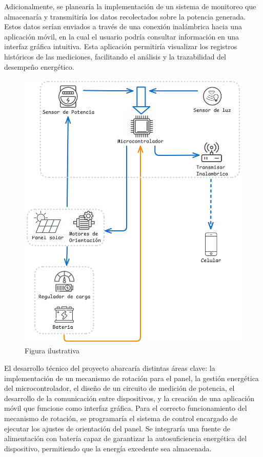 \documentclass[a4paper,12pt]{article}
\begin{document}
Adicionalmente, se planearía la implementación de un sistema de monitoreo que almacenaría y transmitiría los datos recolectados sobre la potencia generada. Estos datos serían enviados a través de una conexión inalámbrica hacia una aplicación móvil, en la cual el usuario podría consultar información en una interfaz gráfica intuitiva. Esta aplicación permitiría visualizar los registros históricos de las mediciones, facilitando el análisis y la trazabilidad del desempeño energético.\\

\begin{figure}[h]
    \centering
    \includegraphics[width=0.7\linewidth]{diagrama_proyecto.png}
    \caption{Figura ilustrativa}
    \label{fig:enter-label}
\end{figure}

El desarrollo técnico del proyecto abarcaría distintas áreas clave: la implementación de un mecanismo de rotación para el panel, la gestión energética del microcontrolador, el diseño de un circuito de medición de potencia, el desarrollo de la comunicación entre dispositivos, y la creación de una aplicación móvil que funcione como interfaz gráfica. Para el correcto funcionamiento del mecanismo de rotación, se programaría el sistema de control encargado de ejecutar los ajustes de orientación del panel. Se integraría una fuente de alimentación con batería capaz de garantizar la autosuficiencia energética del dispositivo, permitiendo que la energía excedente sea almacenada.\\
\end{document}
